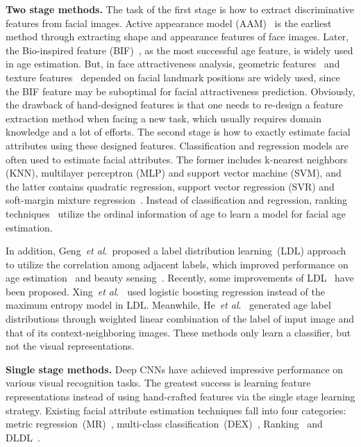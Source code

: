 \documentclass[5p,times,twocolumn]{elsarticle}
\makeatletter
\DeclareRobustCommand\onedot{\@onedot}
\def\@onedot{.}
\def\etal{\emph{et al}\onedot}
\makeatother
\begin{document}
\textbf{Two stage methods.}
The task of the first stage is how to extract discriminative features from facial images. Active appearance model (AAM)~\cite{cootes2001active} is the earliest method through extracting shape and appearance features of face images. Later, the Bio-inspired feature (BIF)~\cite{guo2009human}, as the most successful age feature, is widely used in age estimation. But, in face attractiveness analysis, geometric features~\cite{zhang2011quantitative} and texture features~\cite{kagian2007humanlike} depended on facial landmark positions are widely used, since the BIF feature may be suboptimal for facial attractiveness prediction. Obviously, the drawback of hand-designed features is that one needs to re-design a feature extraction method when facing a new task, which usually requires domain knowledge and a lot of efforts. The second stage is how to exactly estimate facial attributes using these designed features. Classification and regression models {are often} used to estimate facial attributes. The former includes k-nearest neighbors (KNN), multilayer perceptron (MLP) and support vector machine (SVM), and the latter contains quadratic regression, support vector regression (SVR) and soft-margin mixture regression~\cite{huang2017soft}. Instead of classification and regression, ranking techniques~\cite{chang2011ordinal,chen2013cumulative,Wang2015Relative,Li2015Human,Wan2018Auxiliary} utilize the ordinal information of age to learn a model for facial age estimation.

In addition, Geng~\etal ~proposed a label distribution learning~(LDL) approach to utilize the correlation among adjacent labels, which improved performance on age estimation~\cite{geng2013facial} and beauty sensing~\cite{rensense}. Recently, some improvements of LDL~\cite{xing2016logistic,he2017data} have been proposed. Xing~\etal~\cite{xing2016logistic} used logistic boosting regression instead of the maximum entropy model in LDL. Meanwhile, He~\etal~\cite{he2017data} generated age label distributions through weighted linear combination of the label of input image and that of its context-neighboring images. These methods only learn a classifier, but not the visual representations.

\textbf{Single stage methods.} Deep CNNs have achieved impressive performance on various visual recognition tasks. The greatest success is learning feature representations instead of using hand-crafted features via the single stage learning strategy. Existing facial attribute estimation techniques fall into four categories: metric regression~(MR)~\cite{ranjan2017all}, multi-class classification~(DEX)~\cite{rothe2016deep}, Ranking~\cite{niu2016ordinal,chen2017using,Chen2017Deep} and DLDL~\cite{gao2017deep}. 
\end{document}
